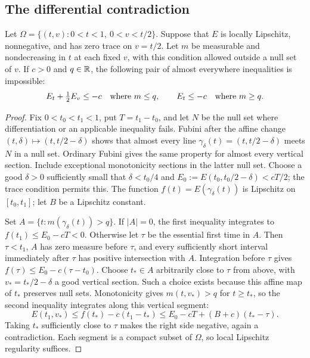\subsection{The differential contradiction}

\begin{lemma}\label{lem:rt-descent}
Let $\Omega=\{(t,v):0<t<1,\ 0<v<t/2\}$.  Suppose that
$E$ is locally Lipschitz, nonnegative, and has zero trace on
$v=t/2$.  Let $m$ be measurable and nondecreasing in $t$ at
each fixed $v$, with this condition allowed outside a null set of
$v$.  If $c>0$ and $q\in\mathbb R$, the following pair of almost
everywhere inequalities is impossible:
\[
 E_t+\tfrac12E_v\le-c\quad\hbox{where }m\le q,
 \qquad
 E_t\le-c\quad\hbox{where }m\ge q.
\]
\end{lemma}

\begin{proof}
Fix $0<t_0<t_1<1$, put $T=t_1-t_0$, and let $N$ be the
null set where differentiation or an applicable inequality fails.
Fubini after the affine change
$(t,\delta)\mapsto(t,t/2-\delta)$ shows that almost every
line $\gamma_\delta(t)=(t,t/2-\delta)$ meets $N$ in a null
set.  Ordinary Fubini gives the same property for almost every
vertical section.  Include exceptional monotonicity sections in
the latter null set.  Choose a good $\delta>0$ sufficiently
small that $\delta<t_0/4$ and
$E_0:=E(t_0,t_0/2-\delta)<cT/2$; the trace condition permits
this.  The function $f(t)=E(\gamma_\delta(t))$ is Lipschitz
on $[t_0,t_1]$; let $B$ be a Lipschitz constant.

Set $A=\{t:m(\gamma_\delta(t))>q\}$.  If $|A|=0$, the
first inequality integrates to $f(t_1)\le E_0-cT<0$.
Otherwise let $\tau$ be the essential first time in $A$.
Then $\tau<t_1$, $A$ has zero measure before $\tau$, and
every sufficiently short interval immediately after $\tau$
has positive intersection with $A$.  Integration before $\tau$
gives $f(\tau)\le E_0-c(\tau-t_0)$.
Choose $t_*\in A$ arbitrarily close to $\tau$ from above,
with $v_*=t_*/2-\delta$ a good vertical section.  Such a
choice exists because this affine map of $t_*$ preserves null
sets.  Monotonicity gives $m(t,v_*)>q$ for $t\ge t_*$,
so the second inequality integrates along this vertical segment:
\[
 E(t_1,v_*)\le f(t_*)-c(t_1-t_*)
 \le E_0-cT+(B+c)(t_*-\tau).
\]
Taking $t_*$ sufficiently close to $\tau$ makes the right side
negative, again a contradiction.  Each segment is a compact subset
of $\Omega$, so local Lipschitz regularity suffices.
\end{proof}

